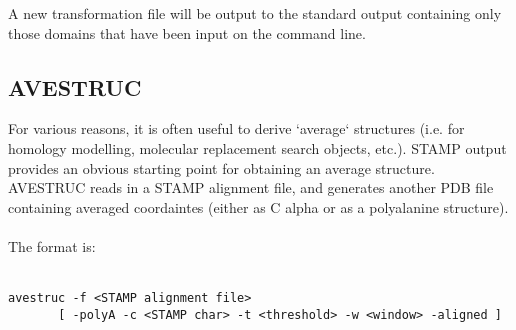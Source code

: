 A new transformation file will be output to the standard output containing only those domains
that have been input on the command line.

\subsection{AVESTRUC}

For various reasons, it is often useful to derive `average`
structures (i.e. for homology modelling, molecular replacement
search objects, etc.).  STAMP output provides an obvious starting
point for obtaining an average structure.  AVESTRUC reads in a
STAMP alignment file, and generates another PDB file containing
averaged coordaintes (either as C alpha or as a polyalanine 
structure).\\
\\
The format is:\\
\\
\begin{scriptsize}\begin{verbatim}
avestruc -f <STAMP alignment file> 
       [ -polyA -c <STAMP char> -t <threshold> -w <window> -aligned ]
\end{verbatim} \end{scriptsize}

